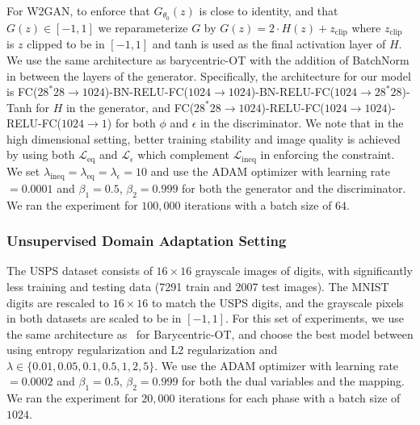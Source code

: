 \documentclass[runningheads]{llncs}
\begin{document}
For W2GAN, to enforce that $G_{\theta_0}(z)$ is close to identity, and that $G(z) \in [-1, 1]$ we reparameterize $G$ by $G(z) = 2\cdot H(z) + z_{\text{clip}}$ where $z_{\text{clip}}$ is $z$ clipped to be in $[-1, 1]$ and tanh is used as the final activation layer of $H$. We use the same architecture as barycentric-OT with the addition of BatchNorm in between the layers of the generator. Specifically, the architecture for our model is FC($28^*28 \rightarrow 1024$)-BN-RELU-FC($1024 \rightarrow 1024$)-BN-RELU-FC($1024 \rightarrow 28^*28$)-Tanh for $H$ in the generator, and FC($28^*28 \rightarrow 1024$)-RELU-FC($1024 \rightarrow 1024$)-RELU-FC($1024 \rightarrow 1$) for both $\phi$ and $\epsilon$ in the discriminator. We note that in the high dimensional setting, better training stability and image quality is achieved by using both $\mathcal{L}_{\text{eq}}$ and $\mathcal{L}_{\epsilon}$ which complement $\mathcal{L}_{\text{ineq}}$ in enforcing the constraint.  We set $\lambda_{\text{ineq}} = \lambda_{\text{eq}} = \lambda_{\epsilon} = 10$ and use the ADAM optimizer with learning rate $= 0.0001$  and $\beta_1 = 0.5$, $\beta_2 = 0.999$ for both the generator and the discriminator. We ran the experiment for $100,000$ iterations with a batch size of $64$. %

\subsubsection{Unsupervised Domain Adaptation Setting}
 The USPS dataset consists of $16 \times 16$ grayscale images of digits, with significantly less training and testing data (7291 train and 2007 test images). The MNIST digits are rescaled to $16 \times 16$ to match the USPS digits, and the grayscale pixels in both datasets are scaled to be in $[-1, 1]$. 
For this set of experiments, we use the same architecture as~\citep{Seguy2018LSOT} for Barycentric-OT, and choose the best model between using entropy regularization and L2 regularization and $\lambda \in \{0.01, 0.05, 0.1, 0.5, 1, 2, 5\}$. We use the ADAM optimizer with learning rate$ = 0.0002$ and $\beta_1 = 0.5$, $\beta_2 = 0.999$ for both the dual variables and the mapping. We ran the experiment for $20,000$ iterations for each phase with a batch size of $1024$. 
\end{document}
